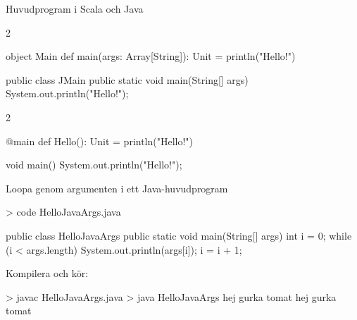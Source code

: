 \begin{Slide}{Huvudprogram i Scala och Java}

\begin{multicols}{2}
  \noindent{}
\begin{CodeSmall}[basicstyle=\footnotesize\ttfamily\SlideFontSize{6}{8},backgroundcolor=\color{white},
  frame=none]
object Main {
  def main(args: Array[String]): Unit = {
    println("Hello!")
  }
}
\end{CodeSmall}

\columnbreak

\noindent{}
\begin{CodeSmall}[language=Java,basicstyle=\footnotesize\ttfamily\SlideFontSize{6}{8},backgroundcolor=\color{white},
  frame=none]
public class JMain {
    public static void main(String[] args){
        System.out.println("Hello!");
    }
}
\end{CodeSmall}
\end{multicols}


\pause
\begin{multicols}{2}
\vspace{1em}\noindent{}
\begin{CodeSmall}[basicstyle=\footnotesize\ttfamily\SlideFontSize{6}{8},backgroundcolor=\color{white},
  frame=none]
@main def Hello(): Unit = 
  println("Hello!")
  
\end{CodeSmall}

\columnbreak

\noindent{}
\begin{CodeSmall}[language=Java,basicstyle=\footnotesize\ttfamily\SlideFontSize{6}{8},backgroundcolor=\color{white},
  frame=none]
void main() {
    System.out.println("Hello!");
}

\end{CodeSmall}
\end{multicols}


\end{Slide}


\begin{Slide}{Loopa genom argumenten i ett Java-huvudprogram}
\begin{REPLnonum}
> code HelloJavaArgs.java
\end{REPLnonum}
\begin{Code}[language=Java]
public class HelloJavaArgs {
    public static void main(String[] args) {
        int i = 0;
        while (i < args.length) {
            System.out.println(args[i]);
            i = i + 1;
        }
    }
}
\end{Code}
Kompilera och kör:
\begin{REPL}
> javac HelloJavaArgs.java
> java HelloJavaArgs hej gurka tomat
hej
gurka
tomat
\end{REPL}
\end{Slide}



